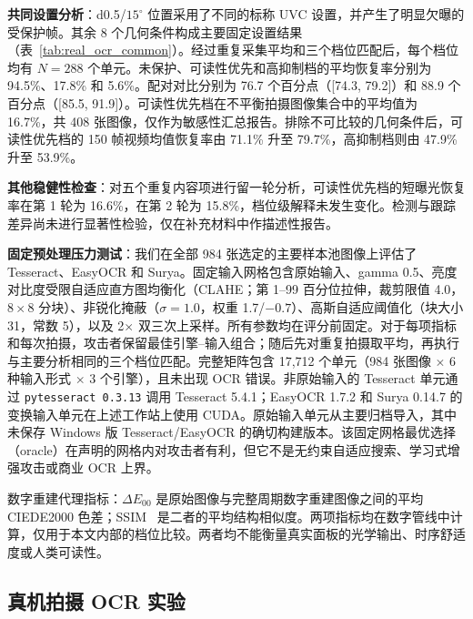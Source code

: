 \documentclass{ieeeaccess}
\begin{document}
\textbf{共同设置分析}：d0.5/$15^{\circ}$ 位置采用了不同的标称 UVC 设置，并产生了明显欠曝的受保护帧。其余 8 个几何条件构成主要固定设置结果（表~\ref{tab:real_ocr_common}）。经过重复采集平均和三个档位匹配后，每个档位均有 $N=288$ 个单元。未保护、可读性优先和高抑制档的平均恢复率分别为 94.5\%、17.8\% 和 5.6\%。配对对比分别为 76.7 个百分点（[74.3, 79.2]）和 88.9 个百分点（[85.5, 91.9]）。可读性优先档在不平衡拍摄图像集合中的平均值为 16.7\%，共 408 张图像，仅作为敏感性汇总报告。排除不可比较的几何条件后，可读性优先档的 150 帧视频均值恢复率由 71.1\% 升至 79.7\%，高抑制档则由 47.9\% 升至 53.9\%。

\textbf{其他稳健性检查}：对五个重复内容项进行留一轮分析，可读性优先档的短曝光恢复率在第 1 轮为 16.6\%，在第 2 轮为 15.8\%，档位级解释未发生变化。检测与跟踪差异尚未进行显著性检验，仅在补充材料中作描述性报告。

\textbf{固定预处理压力测试}：我们在全部 984 张选定的主要样本池图像上评估了 Tesseract、EasyOCR 和 Surya。固定输入网格包含原始输入、gamma 0.5、亮度对比度受限自适应直方图均衡化（CLAHE；第 1--99 百分位拉伸，裁剪限值 4.0，$8\times8$ 分块）、非锐化掩蔽（$\sigma=1.0$，权重 1.7/$-0.7$）、高斯自适应阈值化（块大小 31，常数 5），以及 2$\times$ 双三次上采样。所有参数均在评分前固定。对于每项指标和每次拍摄，攻击者保留最佳引擎--输入组合；随后先对重复拍摄取平均，再执行与主要分析相同的三个档位匹配。完整矩阵包含 17,712 个单元（984 张图像 $\times$ 6 种输入形式 $\times$ 3 个引擎），且未出现 OCR 错误。非原始输入的 Tesseract 单元通过 \texttt{pytesseract 0.3.13} 调用 Tesseract 5.4.1；EasyOCR 1.7.2 和 Surya 0.14.7 的变换输入单元在上述工作站上使用 CUDA。原始输入单元从主要归档导入，其中未保存 Windows 版 Tesseract/EasyOCR 的确切构建版本。该固定网格最优选择（oracle）在声明的网格内对攻击者有利，但它不是无约束自适应搜索、学习式增强攻击或商业 OCR 上界。

数字重建代理指标：$\Delta E_{00}$ 是原始图像与完整周期数字重建图像之间的平均 CIEDE2000 色差；SSIM~\cite{b_wang2004} 是二者的平均结构相似度。两项指标均在数字管线中计算，仅用于本文内部的档位比较。两者均不能衡量真实面板的光学输出、时序舒适度或人类可读性。

\subsection{真机拍摄 OCR 实验}
\label{sec:real_capture}
\end{document}
